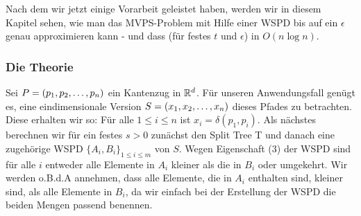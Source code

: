  Nach dem wir jetzt einige Vorarbeit geleistet haben, werden wir in diesem Kapitel sehen, wie man das MVPS-Problem mit Hilfe einer WSPD bis auf ein $\epsilon$ genau approximieren kann - und dass (für festes $t$ und $\epsilon$) in $O(n\log n)$.
    
    \subsubsection*{Die Theorie}
    Sei $P = (p_1, p_2, \mathellipsis, p_n)$ ein Kantenzug in $\mathbb{R}^d$. Für unseren Anwendungsfall genügt es, eine eindimensionale Version $S = (x_1, x_2, \mathellipsis, x_n)$ dieses Pfades zu betrachten. Diese erhalten wir so: Für alle $1 \leq i \leq n$ ist $x_i = \delta(p_1, p_i)$.
    Als nächstes berechnen wir für ein festes $s > 0$ zunächst den Split Tree T und danach eine zugehörige WSPD $\{A_i, B_i\}_{1 \leq i \leq m}$ von $S$. Wegen Eigenschaft (3) der WSPD sind für alle $i$ entweder alle Elemente in $A_i$ kleiner als die in $B_i$ oder umgekehrt. Wir werden o.B.d.A annehmen, dass alle Elemente, die in $A_i$ enthalten sind, kleiner sind, als alle Elemente in $B_i$, da wir einfach bei der Erstellung der WSPD die beiden Mengen passend benennen.
    

